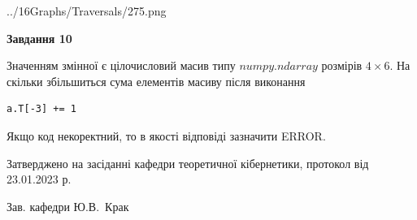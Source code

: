 \documentclass[12pt, ukrainian]{article}
\begin{document}
{\begin {large}
\begin{center}
	{../16Graphs/Traversals/275.png}
\end{center}\par
\newpage

{\begin {center}\textbf{Завдання 10}\end {center}}\par
Значенням змінної  є цілочисловий масив типу $numpy.ndarray$ розмірів $4{\times}6$. На скільки збільшиться сума елементів масиву  після виконання
\begin{verbatim}
a.T[-3] += 1
\end{verbatim}


Якщо код некоректний, то в якості відповіді зазначити ERROR.\par
\newpage


\end {large}
}
{\smallskip \begin {small} Затверджено на засіданні кафедри теоретичної кібернетики, протокол  від   23.01.2023 р.\par\smallskip\smallskip
{\parbox {6.5 cm}{Зав. кафедри \dotfill Ю.В.~Крак}} \end{small}}
\end{document}
